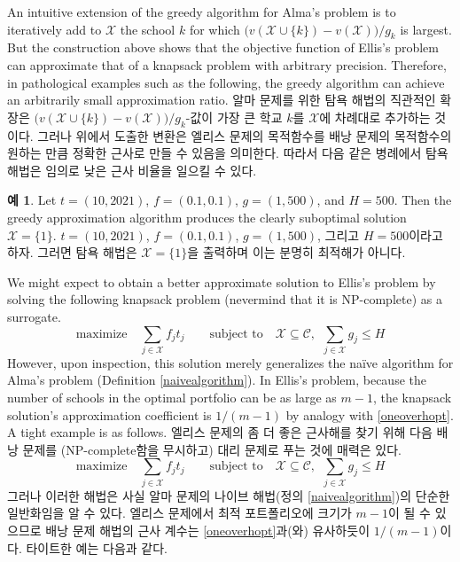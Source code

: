 \documentclass[11pt]{article} %
\theoremstyle{definition}
\newtheorem{example}{Example}
\theoremstyle{definition}
\newtheorem{example}{예}
\begin{document}
\ifen 
An intuitive extension of the greedy algorithm for Alma's problem is to iteratively add to $\mathcal{X}$ the school $k$ for which $\bigl( v(\mathcal{X}\cup\{k\}) - v(\mathcal{X}) \bigr) / g_k$ is largest. But the construction above shows that the objective function of Ellis's problem can approximate that of a knapsack problem with arbitrary precision. Therefore, in pathological examples such as the following, the greedy algorithm can achieve an arbitrarily small approximation ratio. 
\else
알마 문제를 위한 탐욕 해법의 직관적인 확장은 $\bigl( v(\mathcal{X}\cup\{k\}) - v(\mathcal{X}) \bigr) / g_k$-값이 가장 큰 학교 $k$를  $\mathcal{X}$에 차례대로 추가하는 것이다. 그러나 위에서 도출한 변환은 엘리스 문제의 목적함수를 배낭 문제의 목적함수의 원하는 만큼 정확한 근사로 만들 수 있음을 의미한다. 따라서 다음 같은 병례에서 탐욕 해법은 임의로 낮은 근사 비율을 일으킬 수 있다.
\fi
\begin{example} \label{greedyzeroellis}
\ifen
Let $t = (10, 2021)$, $f = (0.1, 0.1)$, $g = (1, 500)$, and $H = 500$. Then the greedy approximation algorithm produces the clearly suboptimal solution $\mathcal{X} = \{1\}$. 
\else
 $t = (10, 2021)$, $f = (0.1, 0.1)$, $g = (1, 500)$, 그리고 $H = 500$이라고 하자. 그러면 탐욕 해법은 $\mathcal{X} = \{1\}$을 출력하며 이는 분명히 최적해가 아니다.
\fi
\end{example} 
\ifen
We might expect to obtain a better approximate solution to Ellis's problem by solving the following knapsack problem (nevermind that it is NP-complete) as a surrogate.
\begin{equation}
\text{maximize}\quad \sum_{j \in \mathcal{X}} f_j t_j \qquad \text{subject to}\quad\mathcal{X}\subseteq\mathcal{C},~~\sum_{j \in \mathcal{X}} g_j \leq H
\end{equation}
However, upon inspection, this solution merely generalizes the na\"ive algorithm for Alma's problem (Definition \ref{naivealgorithm}). In Ellis's problem, because the number of schools in the optimal portfolio can be as large as $m-1$, the knapsack solution's approximation coefficient is $1/(m-1)$ by analogy with \eqref{oneoverhopt}. A tight example is as follows. 
\else
엘리스 문제의 좀 더 좋은 근사해를 찾기 위해 다음 배낭 문제를 (NP-complete함을 무시하고) 대리 문제로 푸는 것에 매력은 있다.
\begin{equation}
\text{maximize}\quad \sum_{j \in \mathcal{X}} f_j t_j \qquad \text{subject to}\quad\mathcal{X}\subseteq\mathcal{C},~~\sum_{j \in \mathcal{X}} g_j \leq H
\end{equation}
그러나 이러한 해법은 사실 알마 문제의 나이브 해법(정의 \ref{naivealgorithm})의 단순한 일반화임을 알 수 있다. 엘리스 문제에서 최적 포트폴리오에 크기가 $m-1$이 될 수 있으므로 배낭 문제 해법의 근사 계수는 \eqref{oneoverhopt}과(와) 유사하듯이 $1 / (m-1)$이다. 타이트한 예는 다음과 같다.
\end{document}
